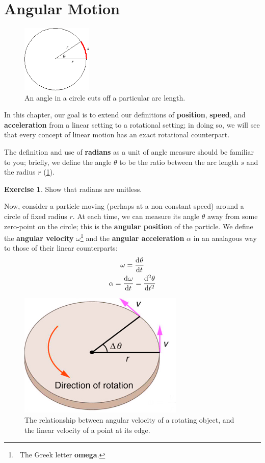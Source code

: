 \documentclass[a4paper]{amsbook}
\theoremstyle{definition}
\newtheorem{exercise}{Exercise}
\numberwithin{exercise}{chapter}
\numberwithin{exercise}{chapter}
\begin{document}
\section{Angular Motion}
\begin{figure}
  \centering
  \includegraphics[width=0.3\textwidth]{radian}
  \caption{An angle in a circle cuts off a particular arc length.\label{fig:radians}}
\end{figure}
In this chapter, our goal is to extend our definitions of \textbf{position}, \textbf{speed}, and \textbf{acceleration} from a linear
setting to a rotational setting; in doing so, we will see that every concept of linear motion has an exact rotational counterpart.

The definition and use of \textbf{radians} as a unit of angle measure should be familiar to you; briefly, we define the
angle $ \theta $ to be the ratio between the arc length $ s $ and the radius $ r $ (\cref{fig:radians}).

\begin{exercise}
  Show that radians are unitless.
\end{exercise}

Now, consider a particle moving (perhaps at a non-constant speed) around a circle of fixed radius $ r $. At each time, we can measure
its angle $ \theta $ away from some zero-point on the circle; this is the \textbf{angular position} of the particle. We define the
\textbf{angular velocity} $ \omega $\footnote{~The Greek letter \textbf{omega}.} and the \textbf{angular acceleration} $ \alpha $
in an analagous way to those of their linear counterparts:
\begin{gather}
  \omega = \dod{\theta}{t}\\
  \alpha = \dod{\omega}{t} = \dod[2]{\theta}{t}
\end{gather}

\begin{figure}
  \centering
  \includegraphics[width=0.7\textwidth]{angvelocity}
  \caption{The relationship between angular velocity of a rotating object, and the linear velocity of a point at its edge.\label{fig:angvelocity}}
\end{figure}
\end{document}
